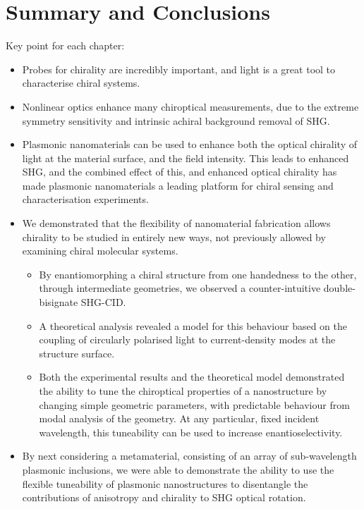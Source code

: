 \chapter{Summary and Conclusions}\label{sec:Conclusions}

\color{red}
Key point for each chapter:
\begin{itemize}
    \item Probes for chirality are incredibly important, and light is a great tool to characterise chiral systems.
    \item Nonlinear optics enhance many chiroptical measurements, due to the extreme symmetry sensitivity and intrinsic achiral background removal of SHG.
    \item Plasmonic nanomaterials can be used to enhance both the optical chirality of light at the material surface, and the field intensity. This leads to enhanced SHG, and the combined effect of this, and enhanced optical chirality has made plasmonic nanomaterials a leading platform for chiral sensing and characterisation experiments.
    \item We demonstrated that the flexibility of nanomaterial fabrication allows chirality to be studied in entirely new ways, not previously allowed by examining chiral molecular systems. 
    \begin{itemize}
        \item By enantiomorphing a chiral structure from one handedness to the other, through intermediate geometries, we observed a counter-intuitive double-bisignate SHG-CID. 
        \item A theoretical analysis revealed a model for this behaviour based on the coupling of circularly polarised light to current-density modes at the structure surface.
        \item Both the experimental results and the theoretical model demonstrated the ability to tune the chiroptical properties of a nanostructure by changing simple geometric parameters, with predictable behaviour from modal analysis of the geometry. At any particular, fixed incident wavelength, this tuneability can be used to increase enantioselectivity.
    \end{itemize}
    \item By next considering a metamaterial, consisting of an array of sub-wavelength plasmonic inclusions, we were able to demonstrate the ability to use the flexible tuneability of plasmonic nanostructures to disentangle the contributions of anisotropy and chirality to SHG optical rotation.

\end{itemize}
